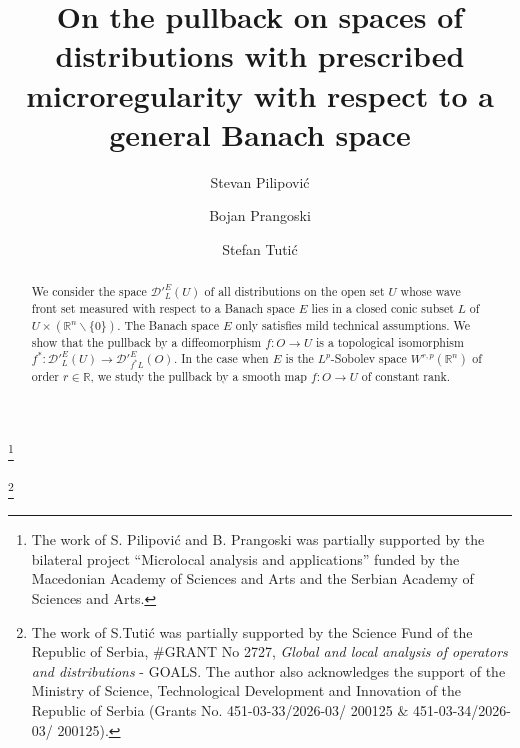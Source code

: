 \documentclass[12pt,reqno]{amsart}
\newcommand{\RR}{\mathbb R}
\newcommand{\DD}{\mathcal D}
\theoremstyle{plain}
\theoremstyle{remark}
\theoremstyle{definition}
\numberwithin{equation}{section}
\begin{document}
\author[S. Pilipovi\' c]{Stevan Pilipovi\' c}
\address{Department of Mathematics and Informatics,
University of Novi Sad, Trg Dositeja Obradovi\'{c}a 4, 21000 Novi Sad, Serbia}

\author[B. Prangoski]{Bojan Prangoski}
\thanks{The work of S. Pilipovi\'c and B. Prangoski was partially supported by the bilateral project ``Microlocal analysis and applications'' funded by the Macedonian Academy of Sciences and Arts and the Serbian Academy of Sciences and Arts.}
\address{Department of Mathematics, Faculty of Mechanical
Engineering-Skopje, Ss. Cyril and Methodius University in Skopje, Karposh 2 b.b., 1000 Skopje, Macedonia}

\author[S. Tuti\' c]{Stefan Tuti\' c}
\thanks{The work of S.Tuti\' c was partially supported by the Science Fund of the Republic of Serbia, $\#$GRANT No 2727, \emph{Global and local analysis of operators and distributions} - GOALS. The author also acknowledges the support of the Ministry of Science, Technological Development and Innovation of the Republic of Serbia (Grants No. 451-03-33/2026-03/ 200125 $\&$ 451-03-34/2026-03/ 200125).}
\address{Department of Mathematics and Informatics,
University of Novi Sad, Trg Dositeja Obradovi\'{c}a 4, 21000 Novi Sad, Serbia}


\title{On the pullback on spaces of distributions with prescribed microregularity with respect to a general Banach space}


\frenchspacing

\begin{abstract}
We consider the space $\DD'^E_L(U)$ of all distributions on the open set $U$ whose wave front set measured with respect to a Banach space $E$ lies in a closed conic subset $L$ of $U\times(\RR^n\backslash\{0\})$. The Banach space $E$ only satisfies mild technical assumptions. We show that the pullback by a diffeomorphism $f:O\rightarrow U$ is a topological isomorphism $f^*:\DD'^E_L(U)\rightarrow\DD'^E_{f^*L}(O)$. In the case when $E$ is the $L^p$-Sobolev space $W^{r,p}(\RR^n)$ of order $r\in\RR$, we study the pullback by a smooth map $f:O\rightarrow U$ of constant rank.
\end{abstract}


\maketitle
\end{document}
